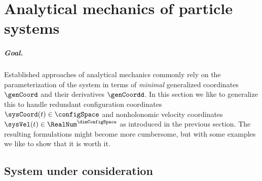 \chapter{Analytical mechanics of particle systems}
\paragraph{Goal.}
Established approaches of analytical mechanics commonly rely on the parameterization of the system in terms of \textit{minimal} generalized coordinates $\genCoord$ and their derivatives $\genCoordd$.
In this section we like to generalize this to handle redundant configuration coordinates $\sysCoord(t) \in \configSpace$ and nonholonomic velocity coordinates $\sysVel(t)\in\RealNum^\dimConfigSpace$ as introduced in the previous section.
The resulting formulations might become more cumbersome, but with some examples we like to show that it is worth it.

\section{System under consideration}\label{sec:DefParticleSys}
